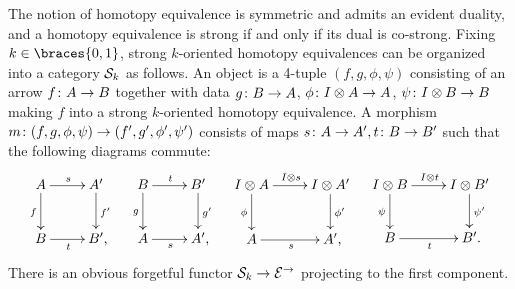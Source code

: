 \documentclass[reqno,10pt,a4paper,oneside,draft]{amsart}
\begin{document}
The notion of homotopy equivalence is symmetric and admits an evident duality, and a homotopy equivalence is strong if and only if its dual is co-strong.
Fixing $k \in \braces{0, 1}$, strong $k$-oriented homotopy equivalences can be organized into a category $\cal{S}_k$ as follows.
An object is a 4-tuple $(f, g, \phi, \psi)$ consisting of an arrow $f \co A \to B$ together with data $g \co B \to A$, $\phi \co \interval \otimes A \to A$, $\psi \co \interval \otimes B \to B$ making $f$ into a strong $k$-oriented homotopy equivalence.
A morphism $m \co (f, g, \phi, \psi) \to (f', g', \phi', \psi')$ consists of maps $s \co A \to A', t \co B \to B'$ such that the following diagrams commute:
\begin{align*}
\xymatrix{
  A
  \ar[r]^{s}
  \ar[d]_{f}
&
  A'
  \ar[d]^{f'}
\\
  B
  \ar[r]_{t}
&
  B'
\rlap{,}}
&&
\xymatrix{
  B
  \ar[r]^{t}
  \ar[d]_{g}
&
  B'
  \ar[d]^{g'}
\\
  A
  \ar[r]_{s}
&
  A'
\rlap{,}}
&&
\xymatrix{
  \interval \otimes A
  \ar[d]_{\phi}
  \ar[r]^{\interval \otimes s}
&
  I \otimes A'
  \ar[d]^{\phi'}
\\
  A
  \ar[r]_{s}
&
  A'
\rlap{,}}
&&
\xymatrix{
  \interval \otimes B
  \ar[d]_{\psi}
  \ar[r]^{\interval \otimes t}
&
  I \otimes B'
  \ar[d]^{\psi'}
\\
  B
  \ar[r]_{t}
&
  B'
\rlap{.}}
\end{align*}
There is an obvious forgetful functor $\cal{S}_k \to \catE^\to$ projecting to the first component.
\end{document}
